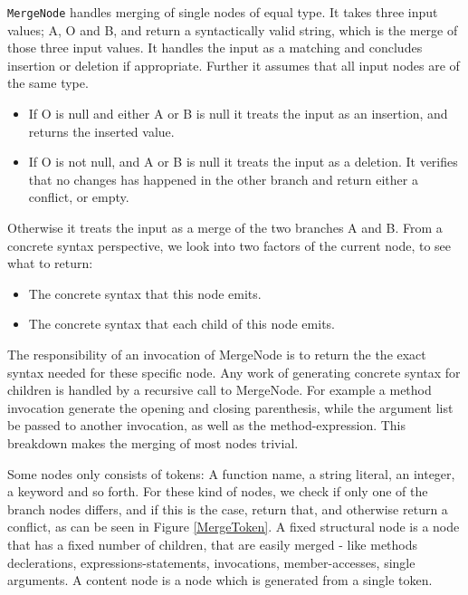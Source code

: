 \documentclass[11pt]{article}
\begin{document}
\texttt{MergeNode} handles merging of single nodes of equal type. It takes three input values; A, O and B, and return a syntactically valid string, which is the merge of those three input values. It handles the input as a matching and concludes insertion or deletion if appropriate. Further it assumes that all input nodes are of the same type.

\begin{itemize}
   \item If O is null and either A or B is null it treats the input as an insertion, and returns the inserted value.
   \item If O is not null, and A or B is null it treats the input as a deletion. It verifies that no changes has happened in the other branch and return either a conflict, or empty.
\end{itemize}

Otherwise it treats the input as a merge of the two branches A and B. From a concrete syntax perspective, we look into two factors of the current node, to see what to return:

\begin{itemize}
   \item The concrete syntax that this node emits.
   \item The concrete syntax that each child of this node emits.
\end{itemize}

The responsibility of an invocation of MergeNode is to return the the exact syntax needed for these specific node. Any work of generating concrete syntax for children is handled by a recursive call to MergeNode. For example a method invocation generate the opening and closing parenthesis, while the argument list be passed to another invocation, as well as the method-expression. This breakdown makes the merging of most nodes trivial.

Some nodes only consists of tokens: A function name, a string literal, an integer, a keyword and so forth. For these kind of nodes, we check if only one of the branch nodes differs, and if this is the case, return that, and otherwise return a conflict, as can be seen in Figure \ref{MergeToken}. A fixed structural node is a node that has a fixed number of children, that are easily merged - like methods declerations, expressions-statements, invocations, member-accesses, single arguments. A content node is a node which is generated from a single token.
\end{document}

